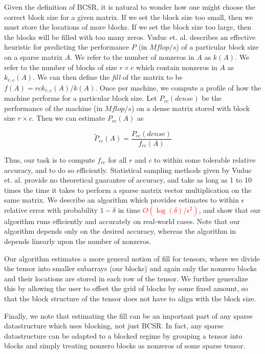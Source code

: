 \documentclass[12pt]{article}
\theoremstyle{dfn}
\numberwithin{equation}{section}
\numberwithin{figure}{section}
\newcommand{\todo}[1] {\textbf{\textcolor{red}{#1}}}
\begin{document}
  Given the definition of BCSR, it is natural to wonder how one might choose the correct block size for a given matrix. If we set the block size too small, then we must store the locations of more blocks. If we set the block size too large, then the blocks will be filled with too many zeros.
  Vuduc et. al. describes an effective heuristic for predicting the performance $P$ (in $Mflop/s$) of a particular block size on a sparse matrix $A$.
  We refer to the number of nonzeros in $A$ as $k(A)$. We refer to the number of blocks of size $r \times c$ which contain nonzeros in $A$ as $k_{r, c}(A)$.
  We can then define the \textit{fill} of the matrix to be $f(A) = rck_{r, c}(A)/k(A)$.
  Once per machine, we compute a profile of how the machine performs for a particular block size.
  Let $P_{rc}(dense)$ be the performance of the machine (in $Mflop/s$) on a dense matrix stored with block size $r \times c$.
  Then we can estimate $P_{rc}(A)$ as

  \[
    \tilde{P}_{rc}(A) = \frac{P_{rc}(dense)}{f_{rc}(A)}
  \]

  Thus, our task is to compute $f_{rc}$ for all $r$ and $c$ to within some tolerable relative accuracy, and to do so efficiently. Statistical sampling methods given by Vuduc et. al. provide no theoretical guarantee of accuracy, and take as long as 1 to 10 times the time it takes to perform a sparse matrix vector multiplication on the same matrix. We describe an algorithm which provides estimates to within $\epsilon$ relative error with probability $1 - \delta$ in time \todo{$O(\log(\delta)/\epsilon^2)$}, and show that our algorithm runs efficiently and accurately on real-world cases. Note that our algorithm depends only on the desired accuracy, whereas the algorithm in \cite{vuduc2003} depends linearly upon the number of nonzeros.

  Our algorithm estimates a more general notion of fill for tensors, where we divide the tensor into smaller subarrays (our blocks) and again only the nonzero blocks and their locations are stored in each row of the tensor. We further generalize this by allowing the user to offset the grid of blocks by some fixed amount, so that the block structure of the tensor does not have to align with the block size.

  Finally, we note that estimating the fill can be an important part of any sparse datastructure which uses blocking, not just BCSR. In fact, any sparse datastructure can be adapted to a blocked regime by grouping a tensor into blocks and simply treating nonzero blocks as nonzeros of some sparse tensor.
\end{document}
